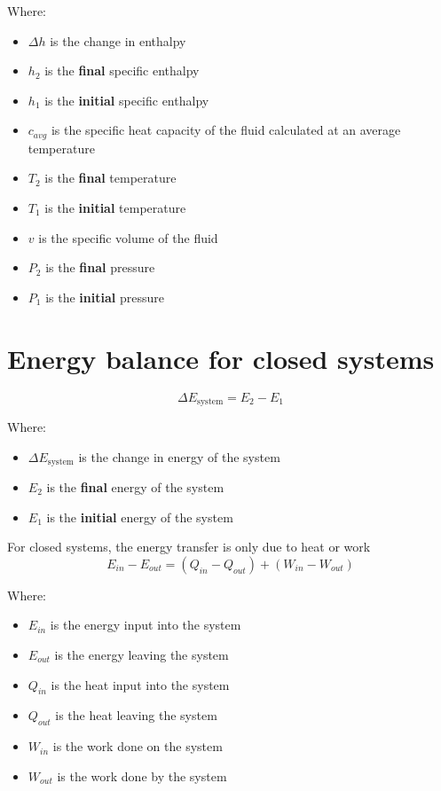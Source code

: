 \documentclass[11pt]{article}
\begin{document}
Where:
\begin{itemize}
\item \(\Delta h\) is the change in enthalpy
\item \(h_2\) is the \textbf{final} specific enthalpy
\item \(h_1\) is the \textbf{initial} specific enthalpy
\item \(c_{avg}\) is the specific heat capacity of the fluid calculated at an average temperature
\item \(T_2\) is the \textbf{final} temperature
\item \(T_1\) is the \textbf{initial} temperature
\item \(v\) is the specific volume of the fluid
\item \(P_2\) is the \textbf{final} pressure
\item \(P_1\) is the \textbf{initial} pressure
\end{itemize}

\newpage

\section{Energy balance for closed systems}
\label{sec:org95a3564}
\[\Delta E_{\text{system}} = E_2 - E_1\]

Where:
\begin{itemize}
\item \(\Delta E_{\text{system}}\) is the change in energy of the system
\item \(E_2\) is the \textbf{final} energy of the system
\item \(E_1\) is the \textbf{initial} energy of the system
\end{itemize}

For closed systems, the energy transfer is only due to heat or work
\[E_{in} - E_{out} = (Q_{in} - Q_{out}) + (W_{in} - W_{out})\]

Where:
\begin{itemize}
\item \(E_{in}\) is the energy input into the system
\item \(E_{out}\) is the energy leaving the system
\item \(Q_{in}\) is the heat input into the system
\item \(Q_{out}\) is the heat leaving the system
\item \(W_{in}\) is the work done on the system
\item \(W_{out}\) is the work done by the system
\end{itemize}
\end{document}
